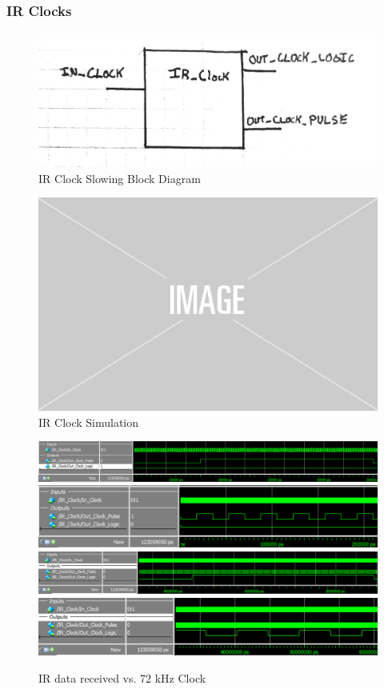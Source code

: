 \documentclass[]{article}
\begin{document}
\subsubsection{IR Clocks}
\begin{figure}[H]\centering
    \includegraphics[width=0.9\linewidth]{figures/IR_Clock_Block.jpg}
    \caption{IR Clock Slowing Block Diagram}
    \label{fig:irClockBlock}
\end{figure}
\begin{figure}[H]\centering
    \includegraphics[width=0.5\linewidth]{figures/placeholder.png}
    \caption{IR Clock Simulation}
    \label{fig:irClockSim}
\end{figure}
\begin{figure}[H]\centering
    \includegraphics[width=\linewidth]{figures/IR_Clock_Sim1.png}
    \includegraphics[width=\linewidth]{figures/IR_Clock_Sim2.png}
    \includegraphics[width=\linewidth]{figures/IR_Clock_Sim3.png}
    \includegraphics[width=\linewidth]{figures/IR_Clock_Sim4.png}
    \caption{IR data received vs. 72 kHz Clock}
    \label{fig:asyncIRData}
\end{figure}
\end{document}
